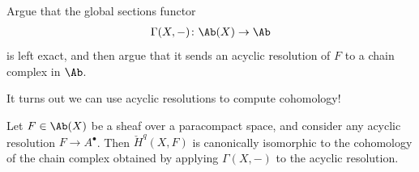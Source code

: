\documentclass[11pt]{amsart}
\begin{document}
\begin{exercise}\label{exer:global-sections-left-exact} 
Argue that the global sections functor
\begin{align*}
    \Gamma(X,-) \colon \Ab(X) \to \Ab
\end{align*}
is left exact, and then argue that it sends an acyclic resolution of $F$ to a chain complex in $\Ab$.
\end{exercise}

It turns out we can use acyclic resolutions to compute cohomology!

\begin{theorem}[\v{C}ech=sheaf cohomology] 
\label{thm:cech-equals-sheaf}
Let $F\in \Ab(X)$ be a sheaf over a paracompact space, and consider any acyclic resolution $F \to A^\bullet$. Then $\check{H}^q(X,F)$ is canonically isomorphic to the cohomology of the chain complex obtained by applying $\Gamma(X,-)$ to the acyclic resolution.
\end{theorem}
\end{document}
